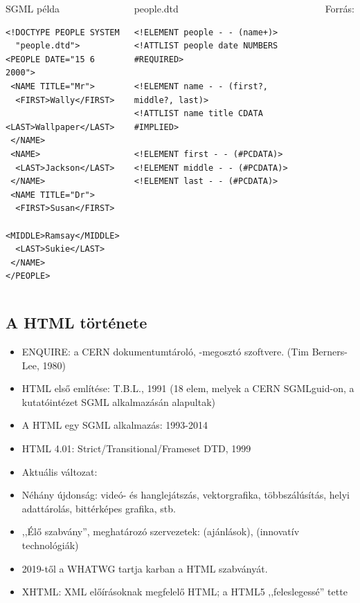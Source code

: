\begin{frame}[fragile]
  \scriptsize
  \begin{columns}[T]
    \begin{exampleblock}{SGML példa}
      \begin{verbatim}
<!DOCTYPE PEOPLE SYSTEM 
  "people.dtd">
<PEOPLE DATE="15 6 2000">
 <NAME TITLE="Mr">
  <FIRST>Wally</FIRST>
  <LAST>Wallpaper</LAST>
 </NAME>
 <NAME>
  <LAST>Jackson</LAST>
 </NAME>
 <NAME TITLE="Dr">
  <FIRST>Susan</FIRST>
  <MIDDLE>Ramsay</MIDDLE>
  <LAST>Sukie</LAST>
 </NAME>
</PEOPLE>
\end{verbatim}
    \end{exampleblock}
    \begin{exampleblock}{people.dtd}
      \begin{verbatim}
<!ELEMENT people - - (name+)>
<!ATTLIST people date NUMBERS #REQUIRED>

<!ELEMENT name - - (first?, middle?, last)>
<!ATTLIST name title CDATA #IMPLIED>

<!ELEMENT first - - (#PCDATA)>
<!ELEMENT middle - - (#PCDATA)>
<!ELEMENT last - - (#PCDATA)>
\end{verbatim}
    \end{exampleblock}
    \tiny
    Forrás: 
  \end{columns}
\end{frame}

\subsection{A HTML története}

\begin{frame}
  \begin{itemize}
    \item ENQUIRE: a CERN dokumentumtároló, -megosztó szoftvere. (Tim Berners-Lee, 1980)
    \item HTML első említése: T.B.L., 1991 (18 elem, melyek a CERN SGMLguid-on, a kutatóintézet SGML alkalmazásán alapultak)
    \item A HTML egy SGML alkalmazás: 1993-2014
    \item HTML 4.01: Strict/Transitional/Frameset DTD, 1999
    \item Aktuális változat: 
    \item Néhány újdonság: videó- és hanglejátszás, vektorgrafika, többszálúsítás, helyi adattárolás, bittérképes grafika, stb.
    \item ,,Élő szabvány'', meghatározó szervezetek:  (ajánlások),  (innovatív technológiák)
    \item 2019-től a WHATWG tartja karban a HTML szabványát.
    \item XHTML: XML előírásoknak megfelelő HTML; a HTML5 ,,feleslegessé'' tette
  \end{itemize}
\end{frame}
